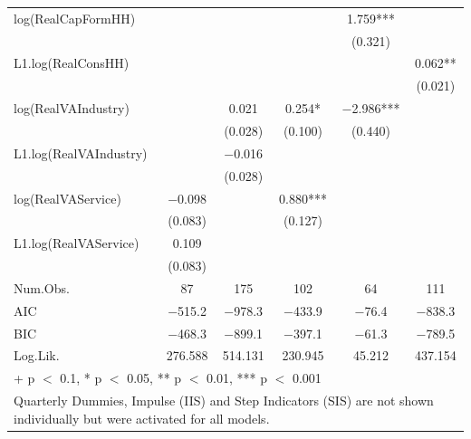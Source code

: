 \begin{table}
{\begin{tabular}[t]{lccccc}
log(RealCapFormHH) &  &  &  & \num{1.759}*** & \\
 &  &  &  & (\num{0.321}) & \\
L1.log(RealConsHH) &  &  &  &  & \num{0.062}**\\
 &  &  &  &  & (\num{0.021})\\
log(RealVAIndustry) &  & \num{0.021} & \num{0.254}* & \num{-2.986}*** & \\
 &  & (\num{0.028}) & (\num{0.100}) & (\num{0.440}) & \\
L1.log(RealVAIndustry) &  & \num{-0.016} &  &  & \\
 &  & (\num{0.028}) &  &  & \\
log(RealVAService) & \num{-0.098} &  & \num{0.880}*** &  & \\
 & (\num{0.083}) &  & (\num{0.127}) &  & \\
L1.log(RealVAService) & \num{0.109} &  &  &  & \\
 & (\num{0.083}) &  &  &  & \\
\midrule
Num.Obs. & \num{87} & \num{175} & \num{102} & \num{64} & \num{111}\\
AIC & \num{-515.2} & \num{-978.3} & \num{-433.9} & \num{-76.4} & \num{-838.3}\\
BIC & \num{-468.3} & \num{-899.1} & \num{-397.1} & \num{-61.3} & \num{-789.5}\\
Log.Lik. & \num{276.588} & \num{514.131} & \num{230.945} & \num{45.212} & \num{437.154}\\
\bottomrule
\multicolumn{6}{l}{\rule{0pt}{1em}+ p $<$ 0.1, * p $<$ 0.05, ** p $<$ 0.01, *** p $<$ 0.001}\\
\multicolumn{6}{l}{\rule{0pt}{1em}Quarterly Dummies, Impulse (IIS) and Step Indicators (SIS) are not shown individually but were activated for all models.}\\
\end{tabular}}
\end{table}
